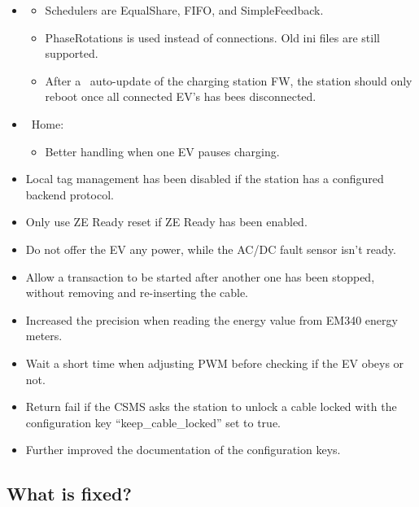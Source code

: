 \documentclass{scrartcl}
\begin{document}
\begin{itemize}
\item \nanogrid
  \begin{itemize}
  \item Schedulers are EqualShare, FIFO, and SimpleFeedback.
  \item PhaseRotations is used instead of connections. Old ini files are
  still supported.
  \item  After a \nanogrid\ auto-update of the charging station FW, the station
  should only reboot once all connected EV's has bees disconnected.
  \end{itemize}
\item \nanogrid\ Home:
  \begin{itemize}
  \item Better handling when one EV pauses charging.
  \end{itemize}
\item Local tag management has been disabled if the station has a configured
  backend protocol.
\item Only use ZE Ready reset if ZE Ready has been enabled.
\item Do not offer the EV any power, while the AC/DC fault sensor isn't ready.
\item Allow a transaction to be started after another one has been stopped,
  without removing and re-inserting the cable.
\item Increased the precision when reading the energy value from EM340 energy
  meters.
\item Wait a short time when adjusting PWM before checking if the EV obeys or
  not.
\item Return fail if the CSMS asks the station to unlock a cable locked with
  the configuration key ``keep\_cable\_locked'' set to true.
\item Further improved the documentation of the configuration keys.
\end{itemize}

\subsection*{What is fixed?}
\end{document}
